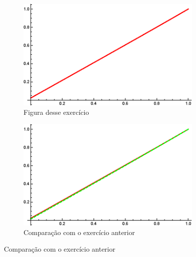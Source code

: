 \documentclass[10pt,a4paper]{article}
\begin{document}
\begin{figure}[h!]
  \begin{subfigure}[b]{0.5\textwidth}
    \includegraphics[width=\textwidth]{figures/exercicio3.eps}
    \caption{Figura desse exercício}
    \label{fig:1}
  \end{subfigure}
  \begin{subfigure}[b]{0.5\textwidth}
    \includegraphics[width=\textwidth]{figures/exercicio4comp.eps}
    \caption{Comparação com o exercício anterior}
    \label{fig:2}
  \end{subfigure}
\end{figure}
\end{document}
